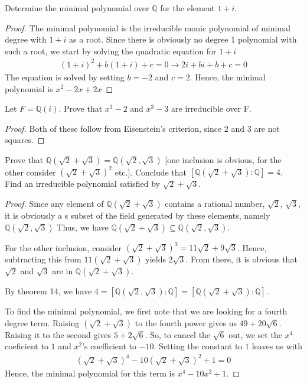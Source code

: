 \documentclass[10pt]{article}
\newcommand{\Q}{\mathbb{Q}}
\newenvironment{problem}[2][Problem]{\begin{trivlist}
		\item[\hskip \labelsep {\bfseries #1}\hskip \labelsep {\bfseries #2.}]}{\end{trivlist}}
\begin{document}
	\begin{problem}{2.3}
		Determine the minimal polynomial over $\Q$ for the element $1 + i$.
		\begin{proof}
			The minimal polynomial is the irreducible monic polynomial of minimal degree with $1+i$ as a root. Since there is obviously no degree 1 polynomial with such a root, we start by solving the quadratic equation for $1+i$
			\begin{align*}
				(1+i)^2 + b(1+i) + c = 0 \rightarrow 2i + bi + b + c = 0
			\end{align*}
			The equation is solved by setting $b=-2$ and $c=2$. Hence, the minimal polynomial is $x^2 - 2x + 2x$
		\end{proof}
	\end{problem}
	
	\begin{problem}{2.5}
		Let $F = \Q(i)$. Prove that $x^3 - 2$ and $x^3-3$ are irreducible over F.
		\begin{proof}
			Both of these follow from Eisenstein's criterion, since $2$ and $3$ are not squares.
		\end{proof}
	\end{problem}
	
	\begin{problem}{2.7}
		Prove that $\Q(\sqrt{2} + \sqrt{3}) = \Q(\sqrt{2}, \sqrt{3})$ [one inclusion is obvious, for the other consider $(\sqrt{2} + \sqrt{3})^2$ etc.]. Conclude that $[\Q(\sqrt{2} + \sqrt{3}):\Q] = 4$. Find an irreducible polynomial
		satisfied by $\sqrt{2} + \sqrt{3}$.
		\begin{proof}
			Since any element of $\Q(\sqrt{2} + \sqrt{3})$ contains a rational number, $\sqrt{2}$, $\sqrt{3}$, it is obviously a s subset of the field generated by these elements, namely $\Q(\sqrt{2}, \sqrt{3})$ Thus, we have $ \Q(\sqrt{2} + \sqrt{3}) \subseteq \Q(\sqrt{2}, \sqrt{3})$.
			
			For the other inclusion, consider $(\sqrt{2} + \sqrt{3})^3 = 11\sqrt{2} + 9\sqrt{3}$. Hence, subtracting this from $11(\sqrt{2} + \sqrt{3})$ yields $2\sqrt{3}$. From there, it is obvious that $\sqrt{2}$ and $\sqrt{3}$ are in $\Q(\sqrt{2} + \sqrt{3})$.
			
			By theorem 14, we have $4 = [\Q(\sqrt{2},\sqrt{3}):\Q] = [\Q(\sqrt{2}+\sqrt{3}):\Q]$.
			
			To find the minimal polynomial, we first note that we are looking for a fourth degree term. Raising $(\sqrt{2}+\sqrt{3})$ to the fourth power gives us $49+20\sqrt{6}$. Raising it to the second gives $5+2\sqrt{6}$. So, to cancel the $\sqrt{6}$ out, we set the $x^4$ coeficient to $1$ and $x^2$'s coefficient to $-10$. Setting the constant to $1$ leaves us with
			\begin{align*}
				(\sqrt{2}+\sqrt{3})^4 - 10(\sqrt{2}+\sqrt{3})^2 + 1 = 0
			\end{align*}
			Hence, the minimal polynomial for this term is $x^4 - 10x^2 + 1$.
		\end{proof}
	\end{problem}
	
\end{document}

